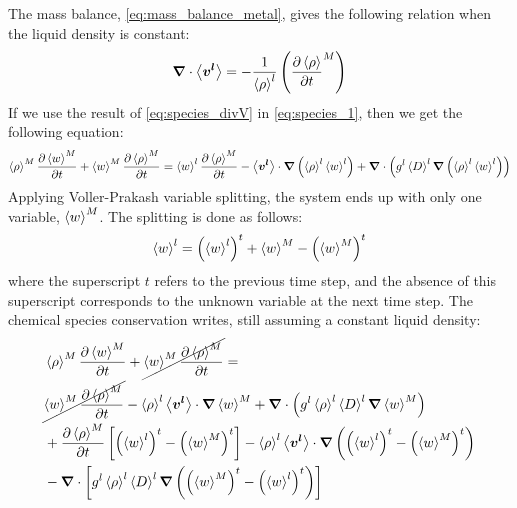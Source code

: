 The mass balance, \cref{eq:mass_balance_metal}, gives the following relation when the liquid density is constant:
\begin{align}
\label{eq:species_divV}
\nabvec \cdot \vit = -\frac{1}{\rhol} \brac{\tempup{\avg{\rho}}^M}
\end{align}
If we use the result of \cref{eq:species_divV} in \cref{eq:species_1}, then we get the following equation:
\begin{align}
\avg{\rho}^M \tempup{\avg{w}^M}  + \avg{w}^M \tempup{\avg{\rho}^M} =
\wl \tempup{\avg{\rho}^M}  - \vit \cdot \nabvec \brac{\rhol \wl} + \nabvec \cdot \brac{\gl \Dl \nabvec \brac{\rhol \wl} }
\end{align}
%
Applying Voller-Prakash \citep{voller_modelling_1989} variable splitting, the system ends up with only one variable, $\avg{w}^M$. 
The splitting is done as follows:
\begin{align}
\label{eq:voller_prakash}
\wl = \brac{\wl}^t + \avg{w}^M - \brac{\avg{w}^M}^t
\end{align}
%
where the superscript $t$ refers to the previous time step, and the absence 
of this superscript corresponds to the unknown variable at the next time step.
The chemical species conservation writes, still assuming a constant liquid density:
%
\begin{align}
  \begin{split}
	& \avg{\rho}^M \tempup{\avg{w}^M}  + \cancel{\avg{w}^M \tempup{\avg{\rho}^M}} = \\
	& \cancel{\avg{w}^M \tempup{\avg{\rho}^M}}  
	  - \rhol \vit \cdot \nabvec \avg{w}^M 
	  + \nabvec \cdot \brac{\gl \rhol \Dl \nabvec \avg{w}^M } \\
	& + \tempup{\avg{\rho}^M} \crochet{\brac{\wl}^t 
	  -  \brac{\avg{w}^M}^t} 
	  - \rhol \vit \cdot \nabvec \brac{\brac{\wl}^t -\brac{\avg{w}^M}^t} \\
	& - \nabvec \cdot \crochet{\gl \rhol \Dl  \nabvec \brac{\brac{\avg{w}^M}^t -\brac{\wl}^t} }
  \end{split}
\end{align}

